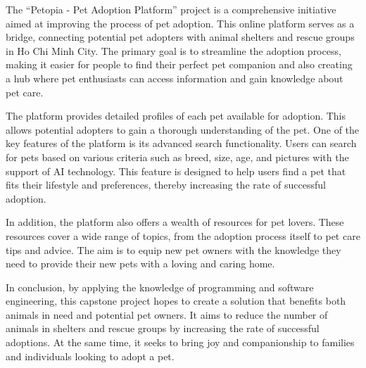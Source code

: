 The “Petopia - Pet Adoption Platform” project is a comprehensive initiative aimed at improving the process of pet adoption. This online platform serves as a bridge, connecting potential pet adopters with animal shelters and rescue groups in Ho Chi Minh City. The primary goal is to streamline the adoption process, making it easier for people to find their perfect pet companion and also creating a hub where pet enthusiasts can access information and gain knowledge about pet care.

The platform provides detailed profiles of each pet available for adoption. This allows potential adopters to gain a thorough understanding of the pet. One of the key features of the platform is its advanced search functionality. Users can search for pets based on various criteria such as breed, size, age, and pictures with the support of AI technology. This feature is designed to help users find a pet that fits their lifestyle and preferences, thereby increasing the rate of successful adoption.

In addition, the platform also offers a wealth of resources for pet lovers. These resources cover a wide range of topics, from the adoption process itself to pet care tips and advice. The aim is to equip new pet owners with the knowledge they need to provide their new pets with a loving and caring home.

In conclusion, by applying the knowledge of programming and software engineering, this capstone project hopes to create a solution that benefits both animals in need and potential pet owners. It aims to reduce the number of animals in shelters and rescue groups by increasing the rate of successful adoptions. At the same time, it seeks to bring joy and companionship to families and individuals looking to adopt a pet.
